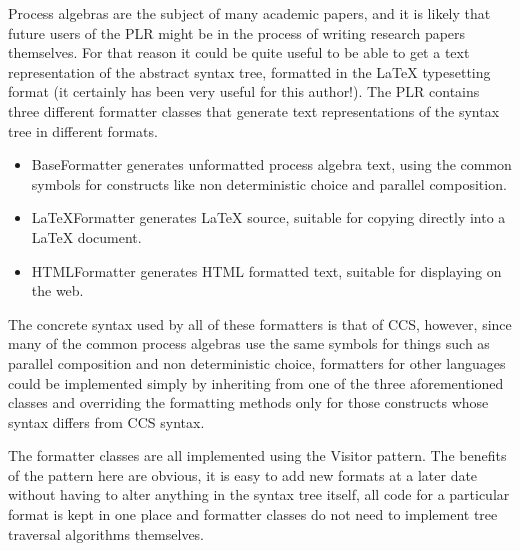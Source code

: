   Process algebras are the subject of many academic papers, and it is likely 
  that future users of the PLR might be in the process of writing research 
  papers themselves. For that reason it could be quite useful to be able to 
  get a text representation of the abstract syntax tree, formatted in the
  LaTeX typesetting format (it certainly has been very useful for this 
  author!). The PLR contains three different formatter classes that generate 
  text representations of the syntax tree in different formats. 
  
  \begin{itemize}
  	\item \textsf{BaseFormatter} generates unformatted process algebra text, 
  	using the common symbols for constructs like non deterministic choice and 
  	parallel composition. 
  	
  	\item \textsf{LaTeXFormatter} generates LaTeX source, suitable for copying 
  	directly into a LaTeX document.
  	
  	\item \textsf{HTMLFormatter} generates HTML formatted text, suitable for 
  	displaying on the web.
  \end{itemize}
  
  The concrete syntax used by all of these formatters is that of CCS, however, 
  since many of the common process algebras use the same symbols for things 
  such as parallel composition and non deterministic choice, formatters for 
  other languages could be implemented simply by inheriting from one of the 
  three aforementioned classes and overriding the formatting methods only for 
  those constructs whose syntax differs from CCS syntax.
  
  The formatter classes are all implemented using the \textsf{Visitor} 
  pattern. The benefits of the pattern here are obvious, it is easy to add new 
  formats at a later date without having to alter anything in the syntax tree
  itself, all code for a particular format is kept in one place and formatter
  classes do not need to implement tree traversal algorithms themselves.

